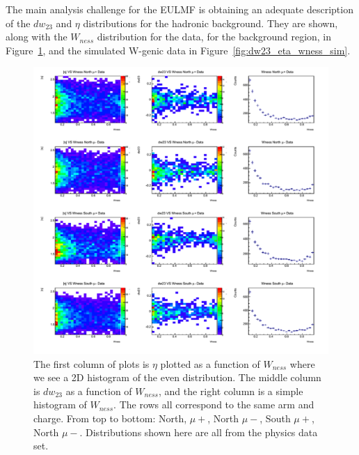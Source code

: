 The main analysis challenge for the EULMF is obtaining an adequate description
of the $dw_{23}$ and $\eta$ distributions for the hadronic background. They are
shown, along with the $W_{ness}$ distribution for the data, for the background
region, in Figure~\ref{fig:dw23_eta_wness_dat}, and the simulated W-genic data
in Figure~\ref{fig:dw23_eta_wness_sim}.

\begin{figure}
  \centering
  \includegraphics[width=\linewidth]{./figures/dw23_vs_wness_data.png}
  \caption{
    The first column of plots is $\eta$ plotted as a function of $W_{ness}$
    where we see a 2D histogram of the even distribution. The middle column is
    $dw_{23}$ as a function of $W_{ness}$, and the right column is a simple
    histogram of $W_{ness}$. The rows all correspond to the same arm and charge.
    From top to bottom: North, $\mu+$, North $\mu-$, South $\mu+$, North $\mu-$.
    Distributions shown here are all from the physics data set.
  }
  \label{fig:dw23_eta_wness_dat}
\end{figure}

